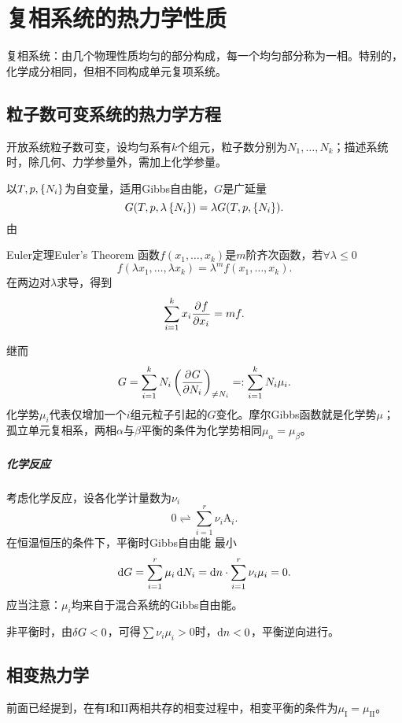 \chapter{复相系统的热力学性质}
复相系统：由几个物理性质均匀的部分构成，每一个均匀部分称为一相。特别的，化学成分相同，但相不同构成单元复项系统。
\section{粒子数可变系统的热力学方程}
开放系统粒子数可变，设均匀系有$k$个组元，粒子数分别为$N_1,\ldots,N_k$；描述系统时，除几何、力学参量外，需加上化学参量。

以$T,p,\left\{N_i\right\}$为自变量，适用Gibbs自由能，$G$是广延量
\[
	G(T,p,\lambda\left\{N_i\right\})=\lambda G(T,p,\left\{N_i\right\}).
\]
由
\begin{theorem}{Euler定理}{Euler's Theorem}
	函数$f(x_1,\ldots,x_k)$是$m$阶齐次函数，若$\forall\lambda\leqslant 0$
	\[
		f(\lambda x_1,\ldots,\lambda x_k)=\lambda^mf(x_1,\ldots,x_k).
	\]
	在两边对$\lambda$求导，得到
	\[
		\sum_{i=1}^kx_i\frac{\partial^{{}}f}{\partial{x_i}^{{}}}=mf.
	\]
\end{theorem}
继而
\[
	G=\sum_{i=1}^kN_i\left(\frac{\partial^{{}}G}{\partial{N_i}^{{}}}\right)_{\neq N_i}=:\sum_{i=1}^kN_i\mu_i.
\]
化学势$\mu_i$代表仅增加一个$i$组元粒子引起的$G$变化。摩尔Gibbs函数就是化学势$\mu$；孤立单元复相系，两相$\alpha$与$\beta$平衡的条件为化学势相同$\mu_\alpha=\mu_\beta$。
\paragraph{化学反应}
考虑化学反应，设各化学计量数为$\nu_i$
\[
	0\rightleftharpoons\sum_{i=1}^r\nu_i{\mathrm A}_i.
\]
在恒温恒压的条件下，平衡时Gibbs自由能%
最小
\begin{align}
	\mathop{}\!\mathrm{d} G=\sum_{i=1}^r\mu_i\mathop{}\!\mathrm{d} N_i=\mathop{}\!\mathrm{d} n\cdot\sum_{i=1}^r\nu_i\mu_i=0.
\end{align}
应当注意：$\mu_i$均来自于混合系统的Gibbs自由能。

非平衡时，由$\mathop{}\!\delta G<0$，可得$\textstyle\sum\nu_i\mu_i>0$时，$\mathop{}\!\mathrm{d} n<0$，平衡逆向进行。
\iffalse
考虑一个由理想气体参与的化学反应，理想气体的化学势
\[
	\mu_i=RT\ln p_i+\const(T).
\]
带入上式可得，有
\[
	\sum_{i=1}^r\nu_iRT\ln p_i=\const(T).
\]
又$p=RT\zkh{{\rm A}_i}$，%
\begin{align}
	\prod_{i=1}^r\zkh{{\rm A}_i}^{\nu_i}=:K(T).
\end{align}
$K$称为化学平衡常数，是$T$的函数。
\fi
\section{相变热力学}
前面已经提到，在有I和II两相共存的相变过程中，相变平衡的条件为$\mu_\mathrm I=\mu_\mathrm{II}$。

